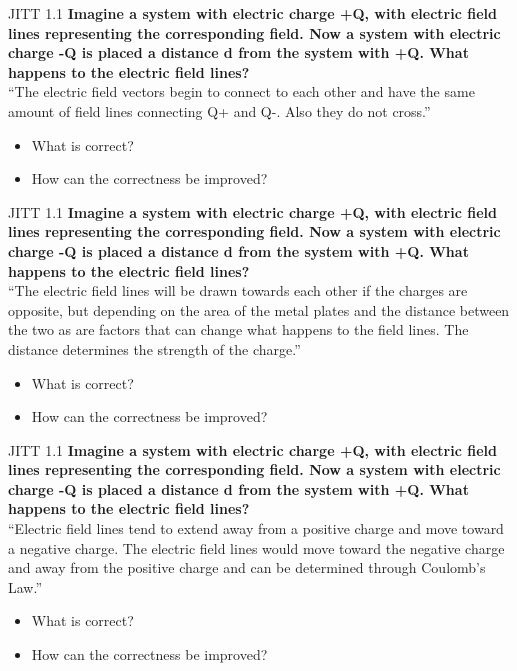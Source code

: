 \documentclass{beamer}
\begin{document}
\begin{frame}{JITT 1.1}
\small
\textbf{Imagine a system with electric charge +Q, with electric field lines representing the corresponding field.  Now a system with electric charge -Q is placed a distance d from the system with +Q.  What happens to the electric field lines?} \\
``The electric field vectors begin to connect to each other and have the same amount of field lines connecting Q+ and Q-. Also they do not cross.''
\begin{itemize}
\item What is correct?
\item How can the correctness be improved?
\end{itemize}
\end{frame}

\begin{frame}{JITT 1.1}
\small
\textbf{Imagine a system with electric charge +Q, with electric field lines representing the corresponding field.  Now a system with electric charge -Q is placed a distance d from the system with +Q.  What happens to the electric field lines?} \\
``The electric field lines will be drawn towards each other if the charges are opposite, but depending on the area of the metal plates and the distance between the two as are factors that can change what happens to the field lines. The distance determines the strength of the charge.''
\begin{itemize}
\item What is correct?
\item How can the correctness be improved?
\end{itemize}
\end{frame}

\begin{frame}{JITT 1.1}
\small
\textbf{Imagine a system with electric charge +Q, with electric field lines representing the corresponding field.  Now a system with electric charge -Q is placed a distance d from the system with +Q.  What happens to the electric field lines?} \\
``Electric field lines tend to extend away from a positive charge and move toward a negative charge. The electric field lines would move toward the negative charge and away from the positive charge and can be determined through Coulomb’s Law.''
\begin{itemize}
\item What is correct?
\item How can the correctness be improved?
\end{itemize}
\end{frame}
\end{document}
